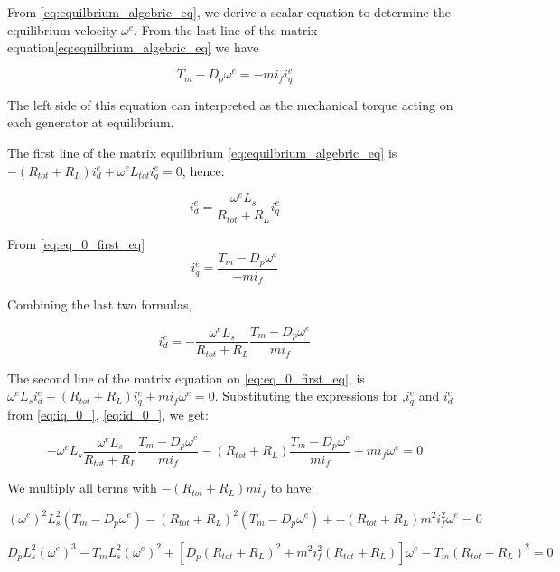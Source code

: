 \documentclass[conference]{IEEEtran}
\begin{document}
From \eqref{eq:equilbrium_algebric_eq}, we derive a scalar
equation to determine the equilibrium velocity $\omega^{e}$.
From the last line of the matrix equation\eqref{eq:equilbrium_algebric_eq} we have

\begin{equation}
T_{m}-D_{p}\omega^{e}=-mi_{f}i_{q}^{e}\label{eq:eq_0_first_eq}
\end{equation}

The left side of this equation can interpreted as the  mechanical torque acting on each
generator at equilibrium.

The first line of the matrix equilibrium \eqref{eq:equilbrium_algebric_eq}
is $-\left(R_{tot}+R_{L}\right)i_{d}^{e}+\omega^{e}L_{tot}i_{q}^{e}=0$,
hence:

\[
i_{d}^{e}=\frac{\omega^{e}L_{s}}{R_{tot}+R_{L}}i_{q}^{e}
\]

From \eqref{eq:eq_0_first_eq} 
\begin{equation}
i_{q}^{e}=\frac{T_{m}-D_{p}\omega^{e}}{-mi_{f}}\label{eq:iq_0_}
\end{equation}

Combining the last two formulas,

\begin{equation}
i_{d}^{e}=-\frac{\omega^{e}L_{s}}{R_{tot}+R_{L}}\frac{T_{m}-D_{p}\omega^{e}}{mi_{f}}\label{eq:id_0_}
\end{equation}

The second line of the matrix equation on \eqref{eq:eq_0_first_eq},
is $\omega^{e}L_{s}i_{d}^{e}+\left(R_{tot}+R_{L}\right)i_{q}^{e}+mi_{f}\omega^{e}=0$.
Substituting the expressions for ,$i_{q}^{e}$ and $i_{d}^{e}$
from \eqref{eq:iq_0_}, \eqref{eq:id_0_}, we get:

\[
-\omega^{e}L_{s}\frac{\omega^{e}L_{s}}{R_{tot}+R_{L}}\frac{T_{m}-D_{p}\omega^{e}}{mi_{f}}-\left(R_{tot}+R_{L}\right)\frac{T_{m}-D_{p}\omega^{e}}{mi_{f}}+mi_{f}\omega^{e}=0
\]

We multiply all terms with $-\left(R_{tot}+R_{L}\right)mi_{f}$ to
have:

\[
\left(\omega^{e}\right)^{2}L_{s}^{2}\left(T_{m}-D_{p}\omega^{e}\right)-\left(R_{tot}+R_{L}\right)^{2}\left(T_{m}-D_{p}\omega^{e}\right)+-\left(R_{tot}+R_{L}\right)m^{2}i_{f}^{2}\omega^{e}=0
\]

\begin{equation}
D_{p}L_{s}^{2}\left(\omega^{e}\right)^{3}-T_{m}L_{s}^{2}\left(\omega^{e}\right)^{2}+\left[D_{p}\left(R_{tot}+R_{L}\right)^{2}+m^{2}i_{f}^{2}\left(R_{tot}+R_{L}\right)\right]\omega^{e}-T_{m}\left(R_{tot}+R_{L}\right)^{2}=0\label{eq:cuibi_eq}
\end{equation}
\end{document}
